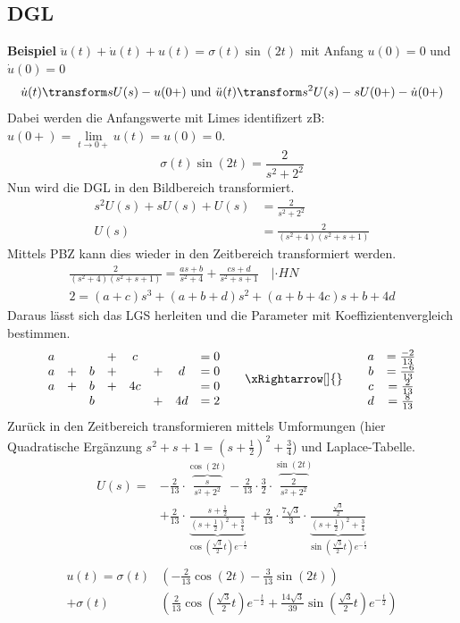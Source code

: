 \subsection{DGL}
\textbf{Beispiel} $\ddot{u}(t) + \dot{u}(t) + u(t) = \sigma(t)\sin(2t)$ mit Anfang $u(0) = 0$ und $\dot{u}(0) = 0$
\[\dot{u}(t) \transform sU(s) - u(0+) \text{ und } \ddot{u}(t) \transform s^2U(s) - sU(0+) - \dot{u}(0+)\]
Dabei werden die Anfangswerte mit Limes identifizert zB: $u(0+) = \lim\limits_{t\rightarrow0+}u(t) = u(0) = 0$.
\[ \sigma(t)\sin(2t) = \frac{2}{s^2 + 2^2} \]
Nun wird die DGL in den Bildbereich transformiert.
\begin{align*}
	s^2U(s) + sU(s) + U(s) &= \frac{2}{s^2 + 2^2} \\
	U(s) &= \frac{2}{(s^2 + 4)(s^2 + s + 1)}
\end{align*}
Mittels PBZ kann dies wieder in den Zeitbereich transformiert werden.
\begin{align*}
	\frac{2}{(s^2 + 4)(s^2 + s + 1)} = \frac{as +b}{s^2 + 4}+\frac{cs + d}{s^2 + s + 1} \quad | \cdot HN \\
	2 = (a + c)s^3 + (a+b+d)s^2 + (a+b+4c)s + b + 4d
\end{align*}
Daraus lässt sich das LGS herleiten und die Parameter mit Koeffizientenvergleich bestimmen.
\[
\begin{matrix}
	a &  &   & + & c  &    &     & = 0 \\
	a &+ & b & + &    & +  & d   &= 0 \\
	a &+ & b & + & 4c &    &     & = 0 \\
	&  & b &   &    & +  & 4d  & = 2\\
\end{matrix} \qquad\xRightarrow[]{}\qquad
\begin{matrix}
	a &= \frac{-2}{13} \\
	b &=\frac{-6}{13} \\
	c &=\frac{2}{13} \\
	d &= \frac{8}{13}\\
\end{matrix}
\]
Zurück in den Zeitbereich transformieren mittels Umformungen (hier Quadratische Ergänzung $s^2 + s +1 = (s+\frac{1}{2})^2 + \frac{3}{4}$) und Laplace-Tabelle.
\begin{align*}
	U(s) =& -\frac{2}{13}\cdot\overbrace{\frac{s}{s^2 +2^2}}^{\cos(2t)} -\frac{2}{13}\cdot\frac{3}{2}\cdot\overbrace{\frac{2}{s^2 + 2^2}}^{\sin(2t)} \\
	& + \frac{2}{13}\cdot\underbrace{\frac{s + \frac{1}{2}}{(s+\frac{1}{2})^2 + \frac{3}{4}}}_{\cos\left(\frac{\sqrt{3}}{2}t\right)e^{-\frac{t}{2}}} + \frac{2}{13}\cdot\frac{7\sqrt{3}}{3}\cdot\underbrace{\frac{\frac{\sqrt{3}}{2}}{(s+\frac{1}{2})^2 + \frac{3}{4}}}_{\sin\left(\frac{\sqrt{3}}{2}t\right)e^{-\frac{t}{2}}} \\
\end{align*}
\begin{align*}
	u(t) = \sigma(t)&\left(-\frac{2}{13}\cos(2t) -\frac{3}{13}\sin(2t)\right) \\
	+ \sigma(t)&\left( \frac{2}{13}\cos\left(\frac{\sqrt{3}}{2}t\right)e^{-\frac{t}{2}} + \frac{14\sqrt{3}}{39}\sin\left(\frac{\sqrt{3}}{2}t\right)e^{-\frac{t}{2}}\right)
\end{align*}

